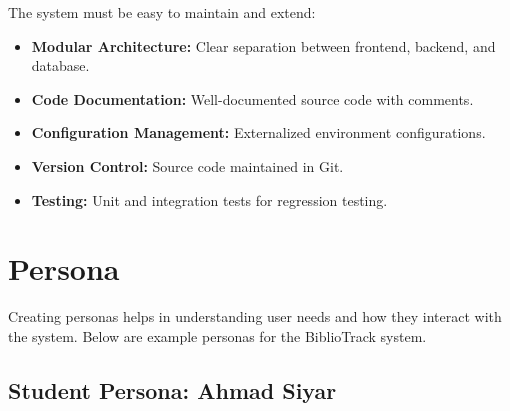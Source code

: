 \documentclass[12pt,a4paper]{report}
\begin{document}
The system must be easy to maintain and extend:

\begin{itemize}
    \item \textbf{Modular Architecture:} Clear separation between frontend, backend, and database.
    \item \textbf{Code Documentation:} Well-documented source code with comments.
    \item \textbf{Configuration Management:} Externalized environment configurations.
    \item \textbf{Version Control:} Source code maintained in Git.
    \item \textbf{Testing:} Unit and integration tests for regression testing.
\end{itemize}

\section{Persona}
\label{sec:persona}

Creating personas helps in understanding user needs and how they interact with the system. Below are example personas for the BiblioTrack system.

\subsection{Student Persona: Ahmad Siyar}
\end{document}
